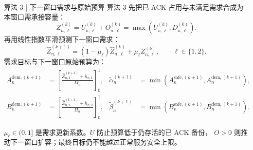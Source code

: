 \begin{frame}{算法 3 | 下一窗口需求与原始预算}
  \small
  算法 3 先把已 ACK 占用与未满足需求合成为本窗口需承接容量：
  \begin{equation}
    Z_{n,\ell}^{(k)}
      =U_{n,\ell}^{(k)}+O_{n,\ell}^{(k)}
      =\max\!\left(U_{n,\ell}^{(k)},D_{n,\ell}^{(k)}\right).
    \label{eq:effective-demand}
  \end{equation}
  再用线性指数平滑预测下一窗口需求：
  \begin{equation}
    \widehat Z_{n,\ell}^{(k+1)}
      =
      (1-\mu_\ell)\widehat Z_{n,\ell}^{(k)}
      +\mu_\ell Z_{n,\ell}^{(k)},
      \qquad
      \ell\in\{1,2\}.
    \label{eq:demand-forecast}
  \end{equation}
  需求目标与下一窗口原始预算为：
  \begin{equation}
    \begin{aligned}
      A_n^{\mathrm{dem},(k+1)}
        &=\left[\frac{\widehat Z_{n,1}^{(k+1)}+h_{n,1}}{M_n}\right]_0^1,
      &\widetilde\alpha_n^{(k+1)}
        &=\min(A_n^{\mathrm{safe},(k+1)},A_n^{\mathrm{dem},(k+1)}),\\
      B_n^{\mathrm{dem},(k+1)}
        &=\left[\frac{\widehat Z_{n,2}^{(k+1)}+h_{n,2}}{H_n}\right]_0^1,
      &\widetilde\beta_n^{(k+1)}
        &=\min(B_n^{\mathrm{safe},(k+1)},B_n^{\mathrm{dem},(k+1)}).
    \end{aligned}
    \label{eq:budget-target}
  \end{equation}

  \scriptsize
  $\mu_\ell\in(0,1]$ 是需求更新系数。$U$ 防止预算低于仍存活的已 ACK 备份，
  $O>0$ 则推动下一窗口扩容；最终目标仍不能越过正常服务安全上限。

  \vspace{0.06cm}
\end{frame}


